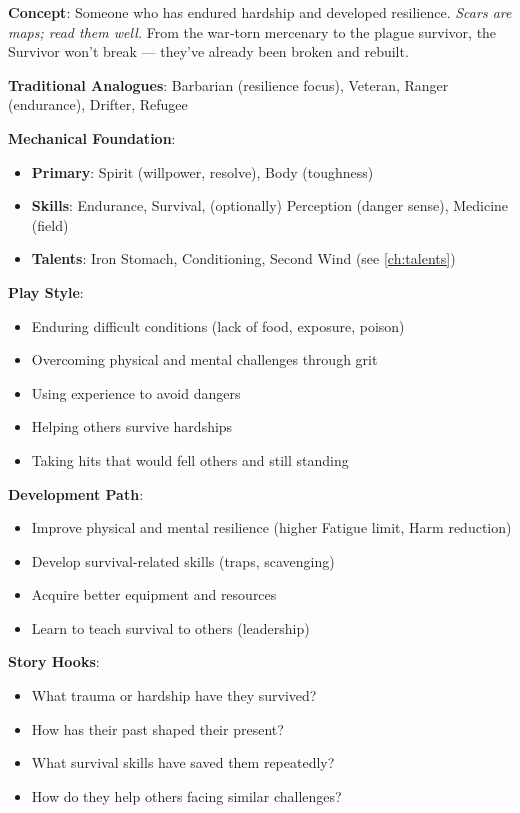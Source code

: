 \textbf{Concept}: Someone who has endured hardship and developed resilience. \emph{Scars are maps; read them well.} From the war‑torn mercenary to the plague survivor, the Survivor won’t break — they’ve already been broken and rebuilt.

\textbf{Traditional Analogues}: Barbarian (resilience focus), Veteran, Ranger (endurance), Drifter, Refugee

\textbf{Mechanical Foundation}:
\begin{itemize}
\item \textbf{Primary}: Spirit (willpower, resolve), Body (toughness)
\item \textbf{Skills}: Endurance, Survival, (optionally) Perception (danger sense), Medicine (field)
\item \textbf{Talents}: Iron Stomach, Conditioning, Second Wind (see \ref{ch:talents})
\end{itemize}

\textbf{Play Style}:
\begin{itemize}
\item Enduring difficult conditions (lack of food, exposure, poison)
\item Overcoming physical and mental challenges through grit
\item Using experience to avoid dangers
\item Helping others survive hardships
\item Taking hits that would fell others and still standing
\end{itemize}

\textbf{Development Path}:
\begin{itemize}
\item Improve physical and mental resilience (higher Fatigue limit, Harm reduction)
\item Develop survival‑related skills (traps, scavenging)
\item Acquire better equipment and resources
\item Learn to teach survival to others (leadership)
\end{itemize}

\textbf{Story Hooks}:
\begin{itemize}
\item What trauma or hardship have they survived?
\item How has their past shaped their present?
\item What survival skills have saved them repeatedly?
\item How do they help others facing similar challenges?
\end{itemize}

